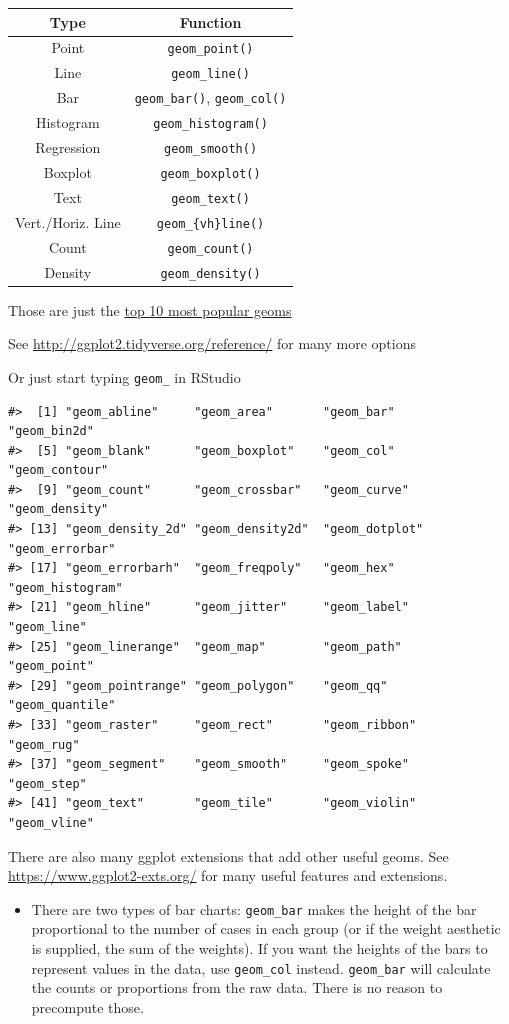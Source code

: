 \documentclass[]{book}
\newenvironment{rmdblock}[1]
  {\begin{shaded*}
  \begin{itemize}
  \renewcommand{\labelitemi}{
    \raisebox{-.7\height}[0pt][0pt]{
      {\setkeys{Gin}{width=3em,keepaspectratio}\texttt{[image: images/\#1]}}
    }
  }
  \item
  }
  {
  \end{itemize}
  \end{shaded*}
  }
\newenvironment{rmdnote}
  {\begin{rmdblock}{note}}
  {\end{rmdblock}}
\theoremstyle{definition}
\theoremstyle{definition}
\theoremstyle{definition}
\theoremstyle{remark}
\begin{document}
\begin{longtable}[]{@{}cc@{}}
\toprule
Type & Function\tabularnewline
\midrule
\endhead
Point & \texttt{geom\_point()}\tabularnewline
Line & \texttt{geom\_line()}\tabularnewline
Bar & \texttt{geom\_bar()}, \texttt{geom\_col()}\tabularnewline
Histogram & \texttt{geom\_histogram()}\tabularnewline
Regression & \texttt{geom\_smooth()}\tabularnewline
Boxplot & \texttt{geom\_boxplot()}\tabularnewline
Text & \texttt{geom\_text()}\tabularnewline
Vert./Horiz. Line & \texttt{geom\_\{vh\}line()}\tabularnewline
Count & \texttt{geom\_count()}\tabularnewline
Density & \texttt{geom\_density()}\tabularnewline
\bottomrule
\end{longtable}

Those are just the
\href{https://eric.netlify.com/2017/08/10/most-popular-ggplot2-geoms/}{top
10 most popular geoms}

See \url{http://ggplot2.tidyverse.org/reference/} for many more options

Or just start typing \texttt{geom\_} in RStudio

\begin{verbatim}
#>  [1] "geom_abline"     "geom_area"       "geom_bar"        "geom_bin2d"     
#>  [5] "geom_blank"      "geom_boxplot"    "geom_col"        "geom_contour"   
#>  [9] "geom_count"      "geom_crossbar"   "geom_curve"      "geom_density"   
#> [13] "geom_density_2d" "geom_density2d"  "geom_dotplot"    "geom_errorbar"  
#> [17] "geom_errorbarh"  "geom_freqpoly"   "geom_hex"        "geom_histogram" 
#> [21] "geom_hline"      "geom_jitter"     "geom_label"      "geom_line"      
#> [25] "geom_linerange"  "geom_map"        "geom_path"       "geom_point"     
#> [29] "geom_pointrange" "geom_polygon"    "geom_qq"         "geom_quantile"  
#> [33] "geom_raster"     "geom_rect"       "geom_ribbon"     "geom_rug"       
#> [37] "geom_segment"    "geom_smooth"     "geom_spoke"      "geom_step"      
#> [41] "geom_text"       "geom_tile"       "geom_violin"     "geom_vline"
\end{verbatim}

There are also many ggplot extensions that add other useful geoms. See
\url{https://www.ggplot2-exts.org/} for many useful features and
extensions.

\begin{rmdnote}
There are two types of bar charts: \texttt{geom\_bar} makes the height
of the bar proportional to the number of cases in each group (or if the
weight aesthetic is supplied, the sum of the weights). If you want the
heights of the bars to represent values in the data, use
\texttt{geom\_col} instead. \texttt{geom\_bar} will calculate the counts
or proportions from the raw data. There is no reason to precompute
those.
\end{rmdnote}
\end{document}
